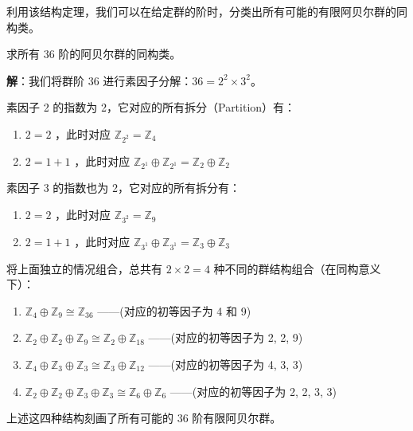 \documentclass[11pt]{article}
\begin{document}
利用该结构定理，我们可以在给定群的阶时，分类出所有可能的有限阿贝尔群的同构类。

\begin{cnexample}
求所有 36 阶的阿贝尔群的同构类。
\end{cnexample}
\textbf{解}：我们将群阶 36 进行素因子分解：$36 = 2^2 \times 3^2$。

素因子 2 的指数为 2，它对应的所有拆分（Partition）有：
\begin{enumerate}
    \item $2 = 2$ ，此时对应 $\mathbb{Z}_{2^2} = \mathbb{Z}_4$
    \item $2 = 1+1$ ，此时对应 $\mathbb{Z}_{2^1} \oplus \mathbb{Z}_{2^1} = \mathbb{Z}_2 \oplus \mathbb{Z}_2$
\end{enumerate}

素因子 3 的指数也为 2，它对应的所有拆分有：
\begin{enumerate}
    \item $2 = 2$ ，此时对应 $\mathbb{Z}_{3^2} = \mathbb{Z}_9$
    \item $2 = 1+1$ ，此时对应 $\mathbb{Z}_{3^1} \oplus \mathbb{Z}_{3^1} = \mathbb{Z}_3 \oplus \mathbb{Z}_3$
\end{enumerate}

将上面独立的情况组合，总共有 $2 \times 2 = 4$ 种不同的群结构组合（在同构意义下）：
\begin{enumerate}
    \item $\mathbb{Z}_4 \oplus \mathbb{Z}_9 \cong \mathbb{Z}_{36}$ ——(对应的初等因子为 4 和 9)
    \item $\mathbb{Z}_2 \oplus \mathbb{Z}_2 \oplus \mathbb{Z}_9 \cong \mathbb{Z}_2 \oplus \mathbb{Z}_{18}$ ——(对应的初等因子为 2, 2, 9)
    \item $\mathbb{Z}_4 \oplus \mathbb{Z}_3 \oplus \mathbb{Z}_3 \cong \mathbb{Z}_3 \oplus \mathbb{Z}_{12}$ ——(对应的初等因子为 4, 3, 3)
    \item $\mathbb{Z}_2 \oplus \mathbb{Z}_2 \oplus \mathbb{Z}_3 \oplus \mathbb{Z}_3 \cong \mathbb{Z}_6 \oplus \mathbb{Z}_6$ ——(对应的初等因子为 2, 2, 3, 3)
\end{enumerate}
上述这四种结构刻画了所有可能的 36 阶有限阿贝尔群。
\end{document}
